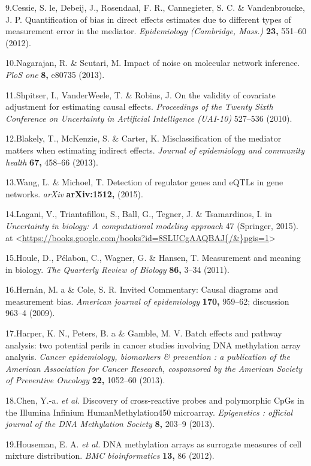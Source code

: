 \documentclass[]{article}
\begin{document}
9.Cessie, S. le, Debeij, J., Rosendaal, F. R., Cannegieter, S. C. \&
Vandenbroucke, J. P. Quantification of bias in direct effects estimates
due to different types of measurement error in the mediator.
\emph{Epidemiology (Cambridge, Mass.)} \textbf{23,} 551--60 (2012).

10.Nagarajan, R. \& Scutari, M. Impact of noise on molecular network
inference. \emph{PloS one} \textbf{8,} e80735 (2013).

11.Shpitser, I., VanderWeele, T. \& Robins, J. On the validity of
covariate adjustment for estimating causal effects. \emph{Proceedings of
the Twenty Sixth Conference on Uncertainty in Artificial Intelligence
(UAI-10)} 527--536 (2010).

12.Blakely, T., McKenzie, S. \& Carter, K. Misclassification of the
mediator matters when estimating indirect effects. \emph{Journal of
epidemiology and community health} \textbf{67,} 458--66 (2013).

13.Wang, L. \& Michoel, T. Detection of regulator genes and eQTLs in
gene networks. \emph{arXiv} \textbf{arXiv:1512,} (2015).

14.Lagani, V., Triantafillou, S., Ball, G., Tegner, J. \& Tsamardinos,
I. in \emph{Uncertainty in biology: A computational modeling approach}
47 (Springer, 2015). at
\textless{}\url{https://books.google.com/books?id=8SLUCgAAQBAJ\{/\&\}pgis=1}\textgreater{}

15.Houle, D., P{é}labon, C., Wagner, G. \& Hansen, T. Measurement and
meaning in biology. \emph{The Quarterly Review of Biology} \textbf{86,}
3--34 (2011).

16.Hern{á}n, M. a \& Cole, S. R. Invited Commentary: Causal diagrams and
measurement bias. \emph{American journal of epidemiology} \textbf{170,}
959--62; discussion 963--4 (2009).

17.Harper, K. N., Peters, B. a \& Gamble, M. V. Batch effects and
pathway analysis: two potential perils in cancer studies involving DNA
methylation array analysis. \emph{Cancer epidemiology, biomarkers \&
prevention : a publication of the American Association for Cancer
Research, cosponsored by the American Society of Preventive Oncology}
\textbf{22,} 1052--60 (2013).

18.Chen, Y.-a. \emph{et al.} Discovery of cross-reactive probes and
polymorphic CpGs in the Illumina Infinium HumanMethylation450
microarray. \emph{Epigenetics : official journal of the DNA Methylation
Society} \textbf{8,} 203--9 (2013).

19.Houseman, E. A. \emph{et al.} DNA methylation arrays as surrogate
measures of cell mixture distribution. \emph{BMC bioinformatics}
\textbf{13,} 86 (2012).
\end{document}
